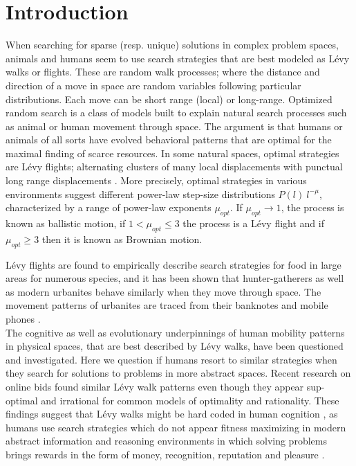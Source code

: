 \section{Introduction}
When searching for sparse (resp. unique) solutions in complex problem spaces, animals and humans seem to use search strategies that are best modeled as L\'evy walks or flights.  These are random walk processes; where the distance and direction of a move in space are random variables following particular distributions.  Each move can be short range (local) or long-range.  Optimized random search is a class of models built to explain natural search processes such as animal or human movement through space.  The argument is that humans or animals of all sorts have evolved behavioral patterns that are optimal for the maximal finding of scarce resources.  In some natural spaces, optimal strategies are L\'evy flights; alternating clusters of many local displacements with punctual long range displacements \cite{viswanathan1999optimizing, edwards2007revisiting,song2010modelling,viswanathan2011physics}.  More precisely, optimal strategies in various environments suggest different power-law step-size distributions $P(l) ~ l^{-\mu}$, characterized by a range of power-law exponents $\mu_{opt}$.  If $\mu_{opt}\rightarrow 1$, the process is known as ballistic motion, if $1<\mu_{opt}\leq3$ the process is a L\'evy flight and if $\mu_{opt}\geq 3$ then it is known as Brownian motion. 

L\'evy flights are found to empirically describe search strategies for food in large areas for numerous species, and it has been shown that hunter-gatherers as well as modern urbanites behave similarly when they move through space.  The movement patterns of urbanites are traced from their banknotes \cite{brockmann2006scaling} and mobile phones \cite{gonzalez2008understanding,song2010modelling}. 
\\

The cognitive as well as evolutionary \cite{radicchi2012evolution} underpinnings of human mobility patterns in physical spaces, that are best described by L\'evy walks, have been questioned and investigated.  Here we question if humans resort to similar strategies when they search for solutions to problems in more abstract spaces.  Recent research on online bids \cite{radicchi2012rationality} found similar L\'evy walk patterns even though they appear sup-optimal and irrational for common models of optimality and rationality.  These findings suggest that L\'evy walks might be hard coded in human cognition \cite{radicchi2012evolution}, as humans use search strategies which do not appear fitness maximizing in modern abstract information and reasoning environments in which solving problems brings rewards in the form of money, recognition, reputation and pleasure \cite{rewards_modern_societies}.\\

